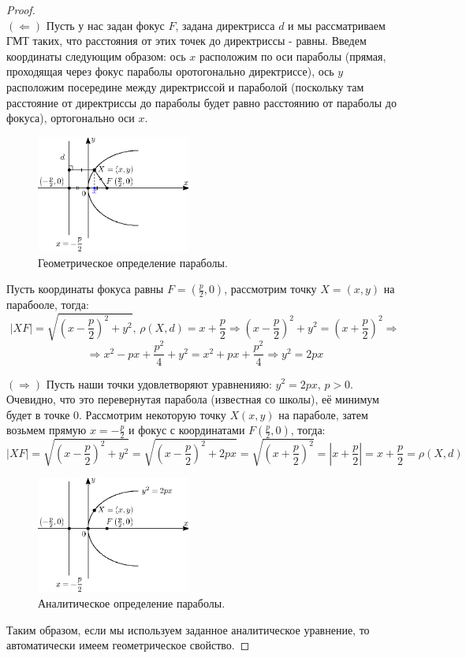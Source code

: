 \documentclass[12pt]{article}
\theoremstyle{definition}
\begin{document}
\begin{proof}\hfill\\
	$(\Leftarrow)$ Пусть у нас задан фокус $F$, задана директрисса $d$ и мы рассматриваем ГМТ таких, что расстояния от этих точек до директриссы - равны. Введем координаты следующим образом: ось $x$ расположим по оси параболы (прямая, проходящая через фокус параболы оротогонально директриссе), ось $y$ расположим посередине между директриссой и параболой (поскольку там расстояние от директриссы до параболы будет равно расстоянию от параболы до фокуса), ортогонально оси $x$.
	
	\begin{figure}[H]
		\centering
		\includegraphics[width=0.45\textwidth]{ANGL3_5.eps}
		\caption{Геометрическое определение параболы.}
		\label{3_5}
	\end{figure}
	Пусть координаты фокуса равны $F = \left(\tfrac{p}{2},0\right)$, рассмотрим точку $X = (x,y)$ на парабооле, тогда:
	$$
		|XF| = \sqrt{\left(x - \dfrac{p}{2}\right)^2 + y^2}, \, \rho(X,d) = x + \dfrac{p}{2} \Rightarrow \left(x - \dfrac{p}{2}\right)^2 + y^2 = \left(x + \dfrac{p}{2}\right)^2 \Rightarrow
	$$
	$$
		\Rightarrow x^2 - px + \dfrac{p^2}{4} + y^2 = x^2 + px + \dfrac{p^2}{4} \Rightarrow y^2 = 2px
	$$
	
	$(\Rightarrow)$ Пусть наши точки удовлетворяют уравненияю: $y^2 = 2px, \, p > 0$. Очевидно, что это перевернутая парабола (известная со школы), её минимум будет в точке $0$. Рассмотрим некоторую точку $X(x,y)$ на параболе, затем возьмем прямую $x = -\tfrac{p}{2}$ и фокус с координатами $F\left(\tfrac{p}{2}, 0\right)$, тогда:
	$$
		|XF| = \sqrt{\left(x - \dfrac{p}{2}\right)^2 + y^2} = \sqrt{\left(x - \dfrac{p}{2}\right)^2 + 2px} = \sqrt{\left(x + \dfrac{p}{2}\right)^2} = \left| x + \dfrac{p}{2}\right| = x + \dfrac{p}{2} = \rho(X,d) 
	$$
	\begin{figure}[H]
		\centering
		\includegraphics[width=0.45\textwidth]{ANGL3_6.eps}
		\caption{Аналитическое определение параболы.}
		\label{3_6}
	\end{figure}
	Таким образом, если мы используем заданное аналитическое уравнение, то автоматически имеем геометрическое свойство.
\end{proof}
\end{document}
